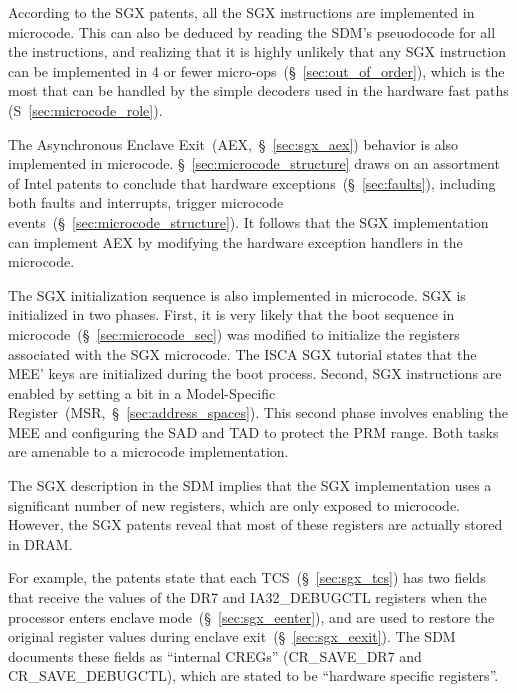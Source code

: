 
According to the SGX patents, all the SGX instructions are implemented in
microcode. This can also be deduced by reading the SDM's pseuodocode for all
the instructions, and realizing that it is highly unlikely that any SGX
instruction can be implemented in 4 or fewer
micro-ops~(\S~\ref{sec:out_of_order}), which is the most that can be
handled by the simple decoders used in the hardware fast paths
(S~\ref{sec:microcode_role}).


The Asynchronous Enclave Exit~(AEX,~\S~\ref{sec:sgx_aex}) behavior is also
implemented in microcode. \S~\ref{sec:microcode_structure} draws on an
assortment of Intel patents to conclude that hardware
exceptions~(\S~\ref{sec:faults}), including both faults and interrupts,
trigger microcode events~(\S~\ref{sec:microcode_structure}). It follows that
the SGX implementation can implement AEX by modifying the hardware exception
handlers in the microcode.


The SGX initialization sequence is also implemented in microcode. SGX is
initialized in two phases. First, it is very likely that the boot sequence in
microcode~(\S~\ref{sec:microcode_sec}) was modified to initialize the registers
associated with the SGX microcode. The ISCA SGX tutorial states that the MEE'
keys are initialized during the boot process. Second, SGX instructions are
enabled by setting a bit in a Model-Specific
Register~(MSR,~\S~\ref{sec:address_spaces}). This second phase involves
enabling the MEE and configuring the SAD and TAD to protect the PRM range. Both
tasks are amenable to a microcode implementation.

The SGX description in the SDM implies that the SGX implementation uses a
significant number of new registers, which are only exposed to microcode.
However, the SGX patents reveal that most of these registers are actually
stored in DRAM.


For example, the patents state that each TCS~(\S~\ref{sec:sgx_tcs}) has two
fields that receive the values of the DR7 and IA32\_DEBUGCTL registers when the
processor enters enclave mode~(\S~\ref{sec:sgx_eenter}), and are used to
restore the original register values during enclave
exit~(\S~\ref{sec:sgx_eexit}). The SDM documents these fields as ``internal
CREGs'' (CR\_SAVE\_DR7 and CR\_SAVE\_DEBUGCTL), which are stated to be
``hardware specific registers''.

